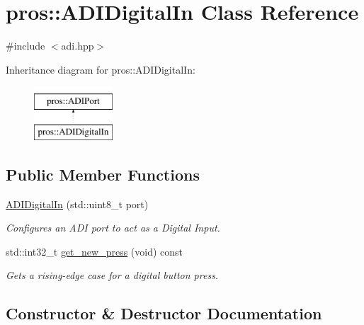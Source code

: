 \hypertarget{classpros_1_1ADIDigitalIn}{}\section{pros\+:\+:A\+D\+I\+Digital\+In Class Reference}
\label{classpros_1_1ADIDigitalIn}


{\ttfamily \#include $<$adi.\+hpp$>$}

Inheritance diagram for pros\+:\+:A\+D\+I\+Digital\+In\+:\begin{figure}[H]
\begin{center}
\leavevmode
\includegraphics[height=2.000000cm]{classpros_1_1ADIDigitalIn}
\end{center}
\end{figure}
\subsection*{Public Member Functions}
\begin{DoxyCompactItemize}
\item 
\hyperlink{classpros_1_1ADIDigitalIn_a08fd8f876b569084bf375ef59116e4f7}{A\+D\+I\+Digital\+In} (std\+::uint8\+\_\+t port)
\begin{DoxyCompactList}\small\item\em Configures an A\+DI port to act as a Digital Input. \end{DoxyCompactList}\item 
std\+::int32\+\_\+t \hyperlink{classpros_1_1ADIDigitalIn_a27d82a95e717eeee61ed6555952a93d8}{get\+\_\+new\+\_\+press} (void) const
\begin{DoxyCompactList}\small\item\em Gets a rising-\/edge case for a digital button press. \end{DoxyCompactList}\end{DoxyCompactItemize}


\subsection{Constructor \& Destructor Documentation}
\mbox{\label{classpros_1_1ADIDigitalIn_a08fd8f876b569084bf375ef59116e4f7}} 
